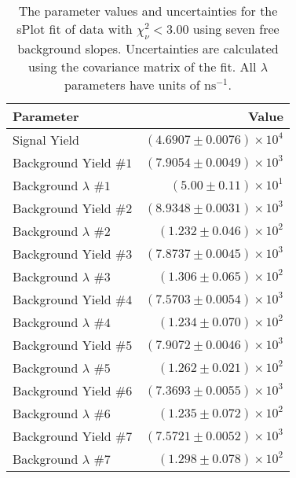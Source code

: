 
\begin{table}[ht]
    \begin{center}
        \begin{tabular}{lr}\toprule
            Parameter & Value \\\midrule
            Signal Yield & $(4.6907 \pm 0.0076) \times 10^{4}$ \\
            Background Yield $\#1$ & $(7.9054 \pm 0.0049) \times 10^{3}$ \\
            Background $\lambda$ $\#1$ & $(5.00 \pm 0.11) \times 10^{1}$ \\
            Background Yield $\#2$ & $(8.9348 \pm 0.0031) \times 10^{3}$ \\
            Background $\lambda$ $\#2$ & $(1.232 \pm 0.046) \times 10^{2}$ \\
            Background Yield $\#3$ & $(7.8737 \pm 0.0045) \times 10^{3}$ \\
            Background $\lambda$ $\#3$ & $(1.306 \pm 0.065) \times 10^{2}$ \\
            Background Yield $\#4$ & $(7.5703 \pm 0.0054) \times 10^{3}$ \\
            Background $\lambda$ $\#4$ & $(1.234 \pm 0.070) \times 10^{2}$ \\
            Background Yield $\#5$ & $(7.9072 \pm 0.0046) \times 10^{3}$ \\
            Background $\lambda$ $\#5$ & $(1.262 \pm 0.021) \times 10^{2}$ \\
            Background Yield $\#6$ & $(7.3693 \pm 0.0055) \times 10^{3}$ \\
            Background $\lambda$ $\#6$ & $(1.235 \pm 0.072) \times 10^{2}$ \\
            Background Yield $\#7$ & $(7.5721 \pm 0.0052) \times 10^{3}$ \\
            Background $\lambda$ $\#7$ & $(1.298 \pm 0.078) \times 10^{2}$ \\\bottomrule
        \end{tabular}
        \caption{The parameter values and uncertainties for the sPlot fit of data with $\chi^2_\nu < 3.00$ using seven free background slopes. Uncertainties are calculated using the covariance matrix of the fit. All $\lambda$ parameters have units of $\si{\nano\second}^{-1}$.}\label{tab:splot-fit-results-chisqdof-3.00-free-7}
    \end{center}
\end{table}
